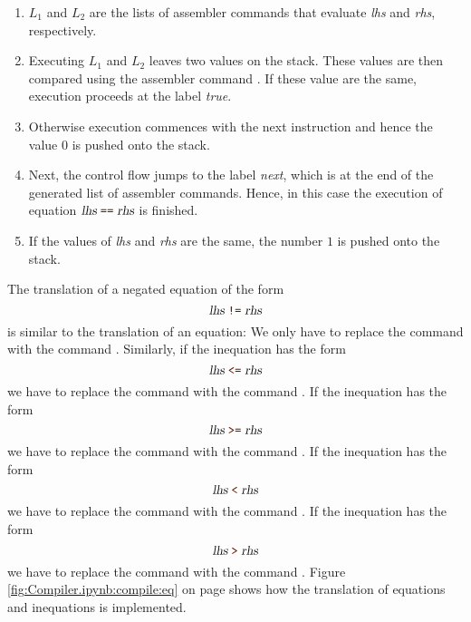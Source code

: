 \begin{enumerate}
\item $L_1$ and $L_2$ are the lists of assembler commands that evaluate  \textsl{lhs} and \textsl{rhs}, respectively.
\item Executing $L_1$ and $L_2$ leaves two values on the stack.  These values are then compared using the
      assembler command .  If these value are the same, execution proceeds at the label
      \textsl{true}.
\item Otherwise execution commences with the next instruction and hence the value $0$ is pushed onto the stack.
\item Next, the control flow jumps to the label \textsl{next}, which is at the end of the generated
      list of assembler commands.  Hence, in this case the execution of equation
      $\textsl{lhs}\; \mytt{==} \;\textsl{rhs}$ is finished. 
\item If the values of \textsl{lhs} and \textsl{rhs} are the same, the number $1$
      is pushed onto the stack.
\end{enumerate}
The translation of a negated equation of the form
\[ \textsl{lhs}\;\mytt{!=}\;\textsl{rhs} \]
is similar to the translation of an equation:  We only have to replace the command  with the
command .  Similarly, if the inequation has the form
\[ \textsl{lhs}\;\mytt{<=}\;\textsl{rhs} \]
we have to replace the command  with the command .
If the inequation has the form
\[ \textsl{lhs}\;\mytt{>=}\;\textsl{rhs} \]
we have to replace the command  with the command .
If the inequation has the form
\[ \textsl{lhs}\;\mytt{<}\;\textsl{rhs} \]
we have to replace the command  with the command .
If the inequation has the form
\[ \textsl{lhs}\;\mytt{>}\;\textsl{rhs} \]
we have to replace the command  with the command .
Figure \ref{fig:Compiler.ipynb:compile:eq} on page \pageref{fig:Compiler.ipynb:compile:eq} shows how the
translation of equations and inequations is implemented.  

